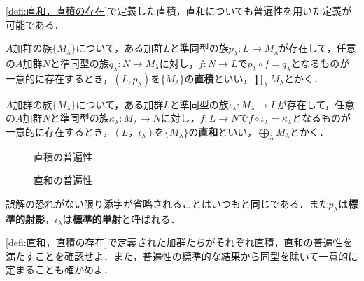 \ref{defi:直和，直積の存在}で定義した直積，直和についても普遍性を用いた定義が可能である．

\begin{defi}[普遍性を用いた直積の定義]
	$A$加群の族$\{M_\lambda\}$について，ある加群$L$と準同型の族$p_\lambda:L\to M_\lambda$が存在して，任意の$A$加群$N$と準同型の族$q_\lambda:N\to M_\lambda$に対し，$f:N\to L$で$p_\lambda\circ f=q_\lambda$となるものが一意的に存在するとき，$(L,p_\lambda)$を$\{M_\lambda\}$の\textbf{直積}といい，$\prod_\lambda M_\lambda$とかく．
\end{defi}

\begin{defi}[普遍性を用いた直和の定義]
	$A$加群の族$\{M_\lambda\}$について，ある加群$L$と準同型の族$\iota_\lambda: M_\lambda\to L$が存在して，任意の$A$加群$N$と準同型の族$\kappa_\lambda: M_\lambda\to N$に対し，$f:L\to N$で$f\circ\iota_\lambda=\kappa_\lambda$となるものが一意的に存在するとき，$(L，\iota_\lambda)$を$\{M_\lambda\}$の\textbf{直和}といい，$\bigoplus_\lambda M_\lambda$とかく．
\end{defi}

\begin{minipage}{.45\textwidth}
	\begin{figure}[H]
		\centering
		\caption{直積の普遍性}
	\end{figure}
\end{minipage}
\hfill
\begin{minipage}{.45\textwidth}
	\begin{figure}[H]
		\centering
		\caption{直和の普遍性}
	\end{figure}
\end{minipage}

誤解の恐れがない限り添字が省略されることはいつもと同じである．また$p_\lambda$は\textbf{標準的射影}，$\iota_\lambda$は\textbf{標準的単射}と呼ばれる．

\begin{exer}
\ref{defi:直和，直積の存在}で定義された加群たちがそれぞれ直積，直和の普遍性を満たすことを確認せよ．また，普遍性の標準的な結果から同型を除いて一意的に定まることも確かめよ．
\end{exer}

